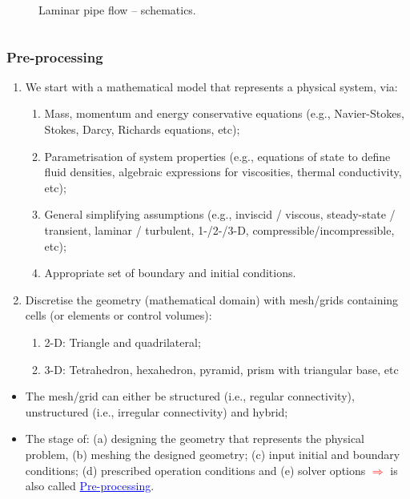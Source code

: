 \documentclass[10pt,compress]{beamer}
\begin{document}
\begin{frame}
\begin{columns}
\begin{column}[l]{0.5\linewidth}
{\begin{figure}
                \caption{Laminar pipe flow -- schematics.}\label{SchematicsPipe}
          \end{figure}}
       \end{column}
    \end{columns}
\end{frame} 
 
\begin{frame}
 \frametitle{Pre-processing} 
\begin{enumerate}
  \item <1-> We start with a mathematical model that represents a physical system, via:
    \begin{enumerate}
      \item <2-> Mass, momentum and energy conservative equations (e.g., Navier-Stokes, Stokes, Darcy, Richards equations, etc);
      \item <3-> Parametrisation of system properties (e.g., equations of state to define fluid densities, algebraic expressions for viscosities, thermal conductivity, etc);
      \item <4-> General simplifying assumptions (e.g., inviscid / viscous, steady-state / transient, laminar / turbulent, 1-/2-/3-D, compressible/incompressible, etc); 
      \item <5-> Appropriate set of boundary and initial conditions.
    \end{enumerate}
  \item <6-> Discretise the geometry (mathematical domain) with mesh/grids containing cells (or elements or control volumes): 
    \begin{enumerate}
      \item <7-> 2-D: Triangle and quadrilateral;
      \item <8-> 3-D: Tetrahedron, hexahedron, pyramid, prism with triangular base, etc 
    \end{enumerate}
\end{enumerate} 
\begin{itemize}
   \item <9-> The mesh/grid can either be structured (i.e., regular connectivity), unstructured (i.e., irregular connectivity) and hybrid;
   \item <10-> The stage of: (a) designing the geometry that represents the physical problem, (b) meshing the designed geometry; (c) input initial and boundary conditions; (d) prescribed operation conditions and (e) solver options \textcolor{red}{$\Longrightarrow$} is also called \textcolor{blue}{\underline{Pre-processing}}.
\end{itemize}  
\end{frame}
 
\end{document}
